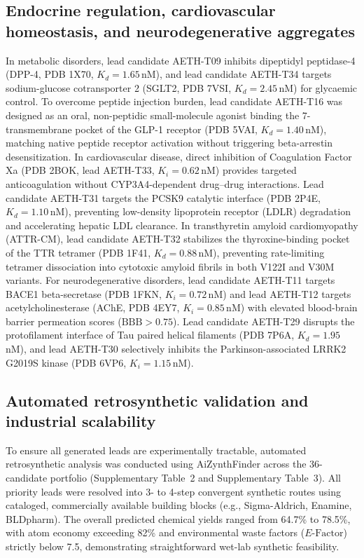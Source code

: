 \documentclass[11pt,a4paper]{article}
\begin{document}
\subsection*{Endocrine regulation, cardiovascular homeostasis, and neurodegenerative aggregates}
In metabolic disorders, lead candidate AETH-T09 inhibits dipeptidyl peptidase-4 (DPP-4, PDB 1X70, $K_d = 1.65$\,nM), and lead candidate AETH-T34 targets sodium-glucose cotransporter 2 (SGLT2, PDB 7VSI, $K_d = 2.45$\,nM) for glycaemic control. To overcome peptide injection burden, lead candidate AETH-T16 was designed as an oral, non-peptidic small-molecule agonist binding the 7-transmembrane pocket of the GLP-1 receptor (PDB 5VAI, $K_d = 1.40$\,nM), matching native peptide receptor activation without triggering beta-arrestin desensitization. In cardiovascular disease, direct inhibition of Coagulation Factor Xa (PDB 2BOK, lead AETH-T33, $K_i = 0.62$\,nM) provides targeted anticoagulation without CYP3A4-dependent drug--drug interactions. Lead candidate AETH-T31 targets the PCSK9 catalytic interface (PDB 2P4E, $K_d = 1.10$\,nM), preventing low-density lipoprotein receptor (LDLR) degradation and accelerating hepatic LDL clearance. In transthyretin amyloid cardiomyopathy (ATTR-CM), lead candidate AETH-T32 stabilizes the thyroxine-binding pocket of the TTR tetramer (PDB 1F41, $K_d = 0.88$\,nM), preventing rate-limiting tetramer dissociation into cytotoxic amyloid fibrils in both V122I and V30M variants. For neurodegenerative disorders, lead candidate AETH-T11 targets BACE1 beta-secretase (PDB 1FKN, $K_i = 0.72$\,nM) and lead AETH-T12 targets acetylcholinesterase (AChE, PDB 4EY7, $K_i = 0.85$\,nM) with elevated blood-brain barrier permeation scores ($\text{BBB} > 0.75$). Lead candidate AETH-T29 disrupts the protofilament interface of Tau paired helical filaments (PDB 7P6A, $K_d = 1.95$\,nM), and lead AETH-T30 selectively inhibits the Parkinson-associated LRRK2 G2019S kinase (PDB 6VP6, $K_i = 1.15$\,nM).

\subsection*{Automated retrosynthetic validation and industrial scalability}
To ensure all generated leads are experimentally tractable, automated retrosynthetic analysis was conducted using AiZynthFinder across the 36-candidate portfolio (Supplementary Table~2 and Supplementary Table~3). All priority leads were resolved into 3- to 4-step convergent synthetic routes using cataloged, commercially available building blocks (e.g., Sigma-Aldrich, Enamine, BLDpharm). The overall predicted chemical yields ranged from 64.7\% to 78.5\%, with atom economy exceeding 82\% and environmental waste factors ($E\text{-Factor}$) strictly below 7.5, demonstrating straightforward wet-lab synthetic feasibility.
\end{document}
